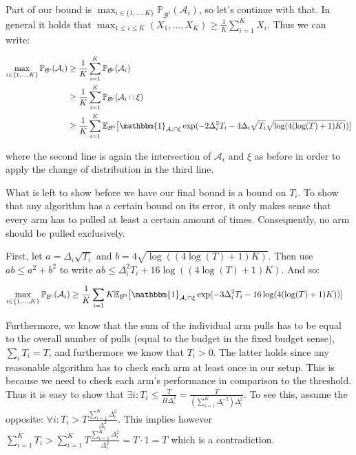 \documentclass[12pt,]{article}
\begin{document}
Part of our bound is
\(\max_{i \in \{1,\dots,K\}} \mathbb{P}_{\mathcal{B}^i}(\mathcal{A}_i)\),
so let's continue with that. In general it holds that
\(\max_{1 \leq i \leq K} (X_1, \dots, X_K) \geq \frac{1}{K}\sum_{i=1}^K X_i\).
Thus we can write:

\begin{align*}
\max_{i \in \{1,\dots,K\}} \mathbb{P}_{\mathcal{B}^i}(\mathcal{A}_i) & \geq \frac{1}{K} \sum_{i=1}^{K} \mathbb{P}_{\mathcal{B}^i}(\mathcal{A}_i) \\
& \geq \frac{1}{K} \sum_{i=1}^{K} \mathbb{P}_{\mathcal{B}^i}(\mathcal{A}_i \cap \xi) \\
& \geq \frac{1}{K} \sum_{i=1}^{K} \mathbb{E}_{\mathcal{B}^0} \big[\mathbbm{1}_{\mathcal{A}_i \cap \xi} \exp (- 2 \Delta_i^2 T_i - 4 \Delta_i \sqrt{T_i} \sqrt{\log(4(\log(T)+1)K)}) ]
\end{align*}

where the second line is again the intersection of \(\mathcal{A}_i\) and
\(\xi\) as before in order to apply the change of distribution in the
third line.

What is left to show before we have our final bound is a bound on
\(T_i\). To show that any algorithm has a certain bound on its error, it
only makes sense that every arm has to pulled at least a certain amount
of times. Consequently, no arm should be pulled exclusively.

First, let \(a = \Delta_i \sqrt{T_i}\) and
\(b = 4\sqrt{\log((4\log(T)+1)K)}\). Then use \(ab \leq a^2 + b^2\) to
write \(ab \leq \Delta_i^2 T_i + 16\log((4\log(T)+1)K)\). And so:

\begin{align*}
\max_{i \in \{1,\dots,K\}} \mathbb{P}_{\mathcal{B}^i}(\mathcal{A}_i) & \geq \frac{1}{K} \sum_{i=1}{K} \mathbb{E}_{\mathcal{B}^0} \big[\mathbbm{1}_{\mathcal{A}_i \cap \xi} \exp (- 3 \Delta_i^2 T_i - 16 \log(4(\log(T)+1)K)) ]
\end{align*}

Furthermore, we know that the sum of the individual arm pulls has to be
equal to the overall number of pulls (equal to the budget in the fixed
budget sense), \(\sum_i T_i = T\), and furthermore we know that
\(T_i>0\). The latter holds since any reasonable algorithm has to check
each arm at least once in our setup. This is because we need to check
each arm's performance in comparison to the threshold. Thus it is easy
to show that
\(\exists i: T_i \leq \frac{T}{H \Delta_i^2} = \frac{T}{(\sum_{i=1}^{K} \Delta_i^{-2}) \Delta_i^2}\).
To see this, assume the opposite:
\(\forall i: T_i > T \frac{\sum_{i=1}^K \Delta_i^2}{\Delta_i^2}\). This
implies however
\(\sum_{i=1}^K T_i > \sum_{i=1}^K T \frac{\sum_{i=1}^K \Delta_i^2}{\Delta_i^2} = T \cdot 1 = T\)
which is a contradiction.
\end{document}
